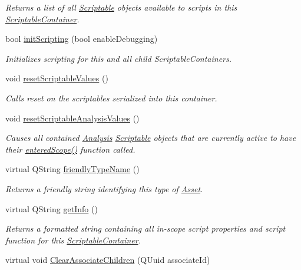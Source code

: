 \begin{DoxyCompactItemize}
\begin{DoxyCompactList}\small\item\em Returns a list of all \hyperlink{class_picto_1_1_scriptable}{Scriptable} objects available to scripts in this \hyperlink{class_picto_1_1_scriptable_container}{Scriptable\-Container}. \end{DoxyCompactList}\item 
bool \hyperlink{class_picto_1_1_scriptable_container_ab3d900d7a5403b8795b0edb54e50a750}{init\-Scripting} (bool enable\-Debugging)
\begin{DoxyCompactList}\small\item\em Initializes scripting for this and all child Scriptable\-Containers. \end{DoxyCompactList}\item 
void \hyperlink{class_picto_1_1_scriptable_container_ad15aa44cda4dfbc099b6da2f926a004e}{reset\-Scriptable\-Values} ()
\begin{DoxyCompactList}\small\item\em Calls reset on the scriptables serialized into this container. \end{DoxyCompactList}\item 
void \hyperlink{class_picto_1_1_scriptable_container_a532aa4ec0d4f15c9cf79b43a0663ded4}{reset\-Scriptable\-Analysis\-Values} ()
\begin{DoxyCompactList}\small\item\em Causes all contained \hyperlink{class_picto_1_1_analysis}{Analysis} \hyperlink{class_picto_1_1_scriptable}{Scriptable} objects that are currently active to have their \hyperlink{class_picto_1_1_scriptable_ad1945e93d9ebf6cb1f1b8d0a400b73c5}{entered\-Scope()} function called. \end{DoxyCompactList}\item 
virtual Q\-String \hyperlink{class_picto_1_1_scriptable_container_ab3e676a5138ce7f49ab924c98fe3d71e}{friendly\-Type\-Name} ()
\begin{DoxyCompactList}\small\item\em Returns a friendly string identifying this type of \hyperlink{class_picto_1_1_asset}{Asset}. \end{DoxyCompactList}\item 
virtual Q\-String \hyperlink{class_picto_1_1_scriptable_container_a4cb05271d66a66d63560f95b1f9d0c61}{get\-Info} ()
\begin{DoxyCompactList}\small\item\em Returns a formatted string containing all in-\/scope script properties and script function for this \hyperlink{class_picto_1_1_scriptable_container}{Scriptable\-Container}. \end{DoxyCompactList}\item 
\hypertarget{class_picto_1_1_scriptable_container_aae5dda0b9e1a2e2d8f9e182d28099020}{virtual void \hyperlink{class_picto_1_1_scriptable_container_aae5dda0b9e1a2e2d8f9e182d28099020}{Clear\-Associate\-Children} (Q\-Uuid associate\-Id)}\label{class_picto_1_1_scriptable_container_aae5dda0b9e1a2e2d8f9e182d28099020}


\end{DoxyCompactItemize}
